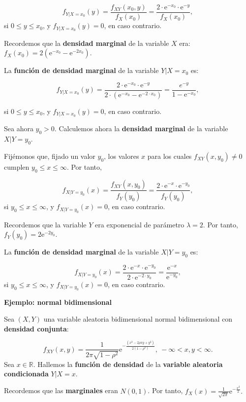 \documentclass[
  letterpaper,
  DIV=11,
  numbers=noendperiod]{scrreprt}
\begin{document}
\[
f_{Y|X=x_0}(y)=\frac{f_{XY}(x_0,y)}{f_X(x_0)}=\frac{2\cdot \mathrm{e}^{-x_0}\cdot \mathrm{e}^{-y}}{f_X(x_0)},
\] si \(0\leq y\leq x_0\), y \(f_{Y|X=x_0}(y)=0\), en caso contrario.

Recordemos que la \textbf{densidad marginal} de la variable \(X\) era:
\(f_X(x_0)=2\left(\mathrm{e}^{-x_0}-\mathrm{e}^{-2x_0}\right)\).

La \textbf{función de densidad marginal} de la variable \(Y|X=x_0\) es:

\[
f_{Y|X=x_0}(y)=\frac{2\cdot \mathrm{e}^{-x_0}\cdot \mathrm{e}^{-y}}{2\cdot \left(\mathrm{e}^{-x_0}-\mathrm{e}^{-2\cdot x_0}\right)}=\frac{e^{-y}}{1-\mathrm{e}^{-x_0}},
\]

si \(0\leq y\leq x_0\), y \(f_{Y|X=x_0}(y)=0\), en caso contrario.

Sea ahora \(y_0>0\). Calculemos ahora la \textbf{densidad marginal} de
la variable \(X|Y=y_0\).

Fijémonos que, fijado un valor \(y_0\), los valores \(x\) para los
cuales \(f_{XY}(x,y_0)\neq 0\) cumplen \(y_0\leq x\leq \infty\). Por
tanto,

\[
f_{X|Y=y_0}(x)=\frac{f_{XY}(x,y_0)}{f_Y(y_0)}=\frac{2\cdot \mathrm{e}^{-x}\cdot \mathrm{e}^{-y_0}}{f_Y(y_0)},
\] si \(y_0\leq x\leq \infty\), y \(f_{X|Y=y_0}(x)=0\), en caso
contrario.

Recordemos que la variable \(Y\) era exponencial de parámetro
\(\lambda=2\). Por tanto, \(f_Y(y_0)=2\mathrm{e}^{-2y_0}\).

La \textbf{función de densidad marginal} de la variable \(X|Y=y_0\) es:

\[
f_{X|Y=y_0}(x)=\frac{2\cdot \mathrm{e}^{-x}\cdot \mathrm{e}^{-y_0}}{2\cdot \mathrm{e}^{-2\cdot y_0}}=\frac{\mathrm{e}^{-x}}{\mathrm{e}^{-y_0}},
\] si \(y_0\leq x\leq \infty\), y \(f_{X|Y=y_0}(x)=0\), en caso
contrario.

\textbf{Ejemplo: normal bidimensional}

Sea \((X,Y)\) una variable aleatoria bidimensional normal bidimensional
con \textbf{densidad conjunta}:

\[
f_{XY}(x,y)=\frac{1}{2\pi\sqrt{1-\rho^2}}\mathrm{e}^{-\frac{(x^2-2\rho xy+y^2)}{2(1-\rho^2)}},\ -\infty <x,y<\infty.
\] Sea \(x\in\mathbb{R}\). Hallemos la \textbf{función de densidad} de
la \textbf{variable aleatoria condicionada} \(Y|X=x\).

Recordemos que las \textbf{marginales} eran \(N(0,1)\). Por tanto,
\(f_X(x)=\frac{1}{\sqrt{2\pi}}\mathrm{e}^{-\frac{x^2}{2}}.\)
\end{document}
